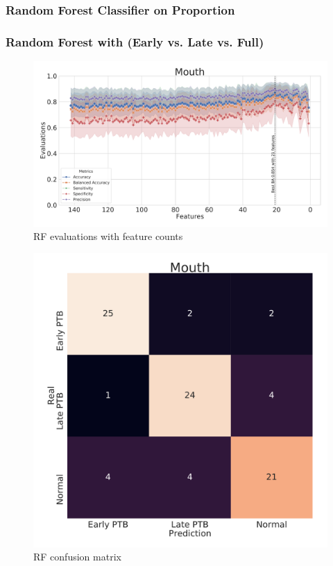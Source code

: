 \documentclass{beamer}
\begin{document}
    \subsubsection{Random Forest Classifier on Proportion}
    \begin{frame}[allowframebreaks]
        \frametitle{Random Forest with (Early vs. Late vs. Full)}

        \begin{figure}
            \includegraphics[width=0.8 \linewidth]{figures/RandomForest_Proportion/RF.DADA2.homd.uncorrected/Mouth+metrics.pdf}
            \caption{RF evaluations with feature counts}
        \end{figure}

        \begin{figure}
            \includegraphics[width=0.5 \linewidth]{figures/RandomForest_Proportion/RF.DADA2.homd.uncorrected/Mouth+heatmap.pdf}
            \caption{RF confusion matrix}
        \end{figure}


\end{frame}
\end{document}
